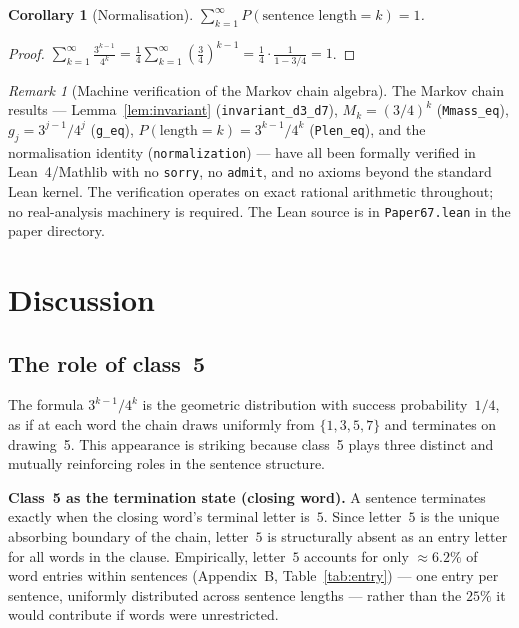 \documentclass[12pt]{article}
\newtheorem{corollary}[theorem]{Corollary}
\theoremstyle{definition}
\theoremstyle{remark}
\newtheorem{remark}[theorem]{Remark}
\begin{document}
\begin{corollary}[Normalisation]
$\sum_{k=1}^{\infty} P(\text{sentence length} = k) = 1$.
\end{corollary}

\begin{proof}
$\sum_{k=1}^{\infty} \frac{3^{k-1}}{4^k} = \frac{1}{4} \sum_{k=1}^{\infty} \left(\frac{3}{4}\right)^{k-1}
= \frac{1}{4} \cdot \frac{1}{1 - 3/4} = 1$.
\end{proof}

\begin{remark}[Machine verification of the Markov chain algebra]
The Markov chain results — Lemma~\ref{lem:invariant} (\texttt{invariant\_d3\_d7}),
$M_k = (3/4)^k$ (\texttt{Mmass\_eq}), $g_j = 3^{j-1}/4^j$ (\texttt{g\_eq}),
$P(\text{length}=k) = 3^{k-1}/4^k$ (\texttt{Plen\_eq}),
and the normalisation identity (\texttt{normalization}) — have all been
formally verified in Lean~4/Mathlib with no \texttt{sorry}, no
\texttt{admit}, and no axioms beyond the standard Lean kernel.
The verification operates on exact rational arithmetic throughout;
no real-analysis machinery is required.
The Lean source is in \texttt{Paper67.lean} in the paper directory.
\end{remark}

\section{Discussion}
\label{sec:discussion}

\subsection{The role of class~5}

The formula $3^{k-1}/4^k$ is the geometric distribution with success
probability~$1/4$, as if at each word the chain draws uniformly from
$\{1,3,5,7\}$ and terminates on drawing~5.
This appearance is striking because class~5 plays three distinct and
mutually reinforcing roles in the sentence structure.

\textbf{Class~5 as the termination state (closing word).}
A sentence terminates exactly when the closing word's terminal letter is~$5$.
Since letter~$5$ is the unique absorbing boundary of the chain, letter~$5$ is
structurally absent as an entry letter for all words in the clause.
Empirically, letter~$5$ accounts for only $\approx 6.2\%$ of word entries within
sentences (Appendix~B, Table~\ref{tab:entry}) — one entry per sentence,
uniformly distributed across sentence lengths — rather than the
$25\%$ it would contribute if words were unrestricted.
\end{document}
